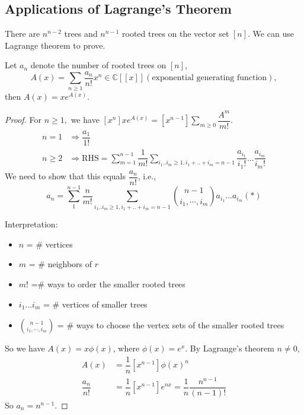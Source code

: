 \subsection{Applications of Lagrange's Theorem}
\begin{theorem}
There are $n^{n-2}$ trees and $n^{n-1}$ rooted trees on the vector set $[n]$.
We can use Lagrange theorem to prove.
\end{theorem}

\begin{proposition}
Let $a_n$ denote the number of rooted trees on $[n]$, 
$$A(x)=\sum\limits_{n\geq 1} \dfrac{a_n}{n!}x^n \in \mathbb{C}[[x]] (\text{exponential generating function}),$$
then $A(x)=xe^{A(x)}$.
\end{proposition}
\begin{proof}
For $n\geq 1,$ we have $[x^n]xe^{A(x)}=[x^{n-1}]\sum\limits_{m\geq 0}\dfrac{A^m}{m!}.$
\begin{align*}
n=1  &\Rightarrow \dfrac{a_1}{1!}\\
n\geq 2 &\Rightarrow \text{RHS}=\sum\limits_{m=1}^{n-1}\dfrac{1}{m!}\sum\limits_{i_1..i_m\geq 1, i_1+..+i_m=n-1} \dfrac{a_{i_1}}{i_1!} ...\dfrac{a_{i_m}}{i_m!}
\end{align*}
We need to show that this equals $\dfrac{a_n}{n!}$, i.e.,$$a_n=\sum\limits_1^{n-1}\dfrac{n}{m!}\sum\limits_{i_1..i_m\geq 1, i_1+..+i_m=n-1}{\binom{n-1}{i_1,\cdots,i_m}}a_{i_1}...a_{i_m}(*)$$

Interpretation:
\begin{itemize}
\item $n$ = \# vertices
\item $m$ = \# neighbors of $r$
\item $m!$ =\# ways to order the smaller rooted trees
\item $i_1...i_m$ = \# vertices of smaller trees
\item $\binom{n-1}{i_1,\cdots,i_m}$ = \# ways  to choose the vertex sets of the smaller rooted trees
\end{itemize}

So we have $A(x)=x\phi(x)$, where $\phi(x)=e^x$. By Lagrange's theorem $n\neq 0$,
\begin{align*}
[x^n]A(x)&=\dfrac{1}{n}[x^{n-1}]\phi(x)^n\\
\dfrac{a_n}{n!}&=\dfrac{1}{n}[x^{n-1}]e^{nx} =\dfrac{1}{n}\dfrac{n^{n-1}}{(n-1)!}
\end{align*}
So $a_n=n^{n-1}.$
\end{proof}

